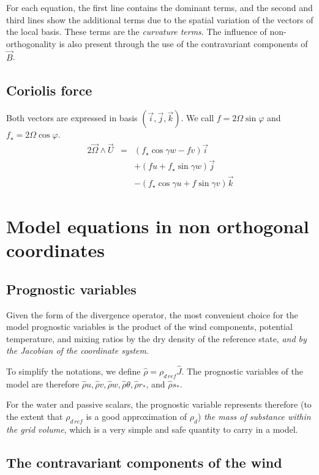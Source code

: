 For each equation, the first line contains the dominant terms, and the
second and third lines show the additional terms due to the spatial
variation of the vectors of the local basis. These terms are the
{\em curvature terms}. The influence of non-orthogonality is also
present through the use of the contravariant components of $\vec{B}$.

\subsection{Coriolis force}

Both vectors are expressed in basis $(\vec{i},\vec{j},\vec{k})$.
We call $f=2\Omega \sin\varphi$ and $f_{\star}=2\Omega \cos\varphi$.
\begin{eqnarray}
2\vec{\Omega}\wedge\vec{U}&=&(f_{\star} \cos\gamma w - f v ) \vec{i} \nonumber\\
& & + (f u + f_{\star} \sin \gamma w ) \vec{j} \nonumber \\
& & - (f_{\star} \cos\gamma u + f \sin \gamma v ) \vec{k}
\end{eqnarray}

\section{Model equations in non orthogonal coordinates}
\subsection{Prognostic variables}
Given the form of the divergence operator, the most convenient choice for the
model prognostic variables is the product of the wind components, potential
temperature, and mixing ratios by the dry density of the reference state,
{\em and by the Jacobian of the coordinate system}.

To simplify the notations, we define $\widehat{\rho}=\rho_{d\,ref}\widehat{J}$.
The prognostic variables of the model are therefore $\widehat{\rho}u,
\widehat{\rho}v, \widehat{\rho}w, \widehat{\rho}\theta, \widehat{\rho}r_{*}$,
and $\widehat{\rho} s_{*}$.

For the water and passive scalars, the prognostic variable represents therefore
(to the extent that $\rho_{d\,ref}$ is a good approximation of $\rho_d$)
{\em the mass of substance within the grid volume}, which is a very simple and
safe quantity to carry in a model.

\subsection{The contravariant components of the wind}

